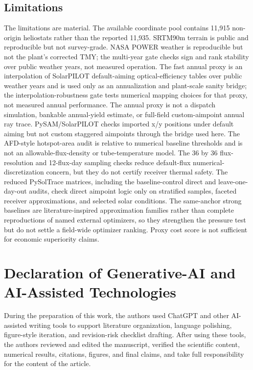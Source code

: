 \documentclass[final,3p,times]{elsarticle}
\begin{document}
\subsection{Limitations}
The limitations are material. The available coordinate pool contains 11,915 non-origin heliostats rather than the reported 11,935. SRTM90m terrain is public and reproducible but not survey-grade. NASA POWER weather is reproducible but not the plant's corrected TMY; the multi-year gate checks sign and rank stability over public weather years, not measured operation. The fast annual proxy is an interpolation of SolarPILOT default-aiming optical-efficiency tables over public weather years and is used only as an annualization and plant-scale sanity bridge; the interpolation-robustness gate tests numerical mapping choices for that proxy, not measured annual performance. The annual proxy is not a dispatch simulation, bankable annual-yield estimate, or full-field custom-aimpoint annual ray trace. PySAM/SolarPILOT checks imported x/y positions under default aiming but not custom staggered aimpoints through the bridge used here. The AFD-style hotspot-area audit is relative to numerical baseline thresholds and is not an allowable-flux-density or tube-temperature model. The 36 by 36 flux-resolution and 12-flux-day sampling checks reduce default-flux numerical-discretization concern, but they do not certify receiver thermal safety. The reduced PySolTrace matrices, including the baseline-control direct and leave-one-day-out audits, check direct aimpoint logic only on stratified samples, faceted receiver approximations, and selected solar conditions. The same-anchor strong baselines are literature-inspired approximation families rather than complete reproductions of named external optimizers, so they strengthen the pressure test but do not settle a field-wide optimizer ranking. Proxy cost score is not sufficient for economic superiority claims.
\FloatBarrier

\section{Declaration of Generative-AI and AI-Assisted Technologies}
During the preparation of this work, the authors used ChatGPT and other AI-assisted writing tools to support literature organization, language polishing, figure-style iteration, and revision-risk checklist drafting. After using these tools, the authors reviewed and edited the manuscript, verified the scientific content, numerical results, citations, figures, and final claims, and take full responsibility for the content of the article.
\end{document}
